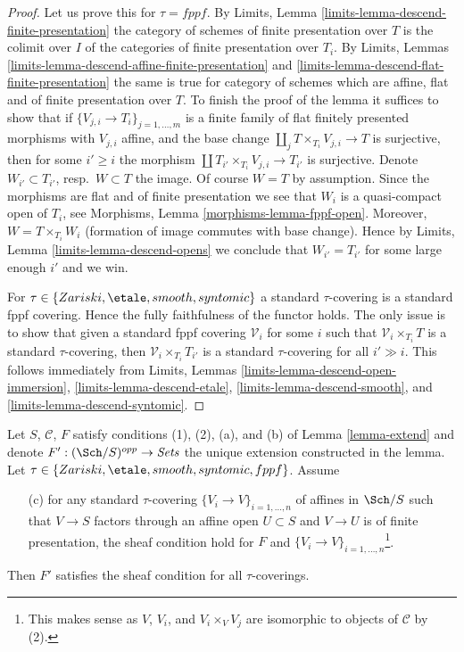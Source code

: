 \begin{proof}
Let us prove this for $\tau = fppf$.
By Limits, Lemma \ref{limits-lemma-descend-finite-presentation}
the category of schemes of finite presentation over $T$ is the
colimit over $I$ of the categories of finite presentation over $T_i$. By
Limits, Lemmas \ref{limits-lemma-descend-affine-finite-presentation}
and \ref{limits-lemma-descend-flat-finite-presentation}
the same is true for category of schemes which are affine, flat and
of finite presentation over $T$.
To finish the proof of the lemma it suffices to show that if
$\{V_{j, i} \to T_i\}_{j = 1, \ldots, m}$ is a finite family of
flat finitely presented morphisms with $V_{j, i}$ affine, and the
base change $\coprod_j T \times_{T_i} V_{j, i} \to T$ is surjective,
then for some $i' \geq i$ the morphism
$\coprod T_{i'} \times_{T_i} V_{j, i} \to T_{i'}$ is surjective.
Denote $W_{i'} \subset T_{i'}$, resp.\ $W \subset T$ the image.
Of course $W = T$ by assumption.
Since the morphisms are flat and of finite presentation we see that
$W_i$ is a quasi-compact open of $T_i$, see
Morphisms, Lemma \ref{morphisms-lemma-fppf-open}.
Moreover, $W = T \times_{T_i} W_i$ (formation of image commutes
with base change). Hence by
Limits, Lemma \ref{limits-lemma-descend-opens}
we conclude that $W_{i'} = T_{i'}$ for some large enough $i'$
and we win.

\medskip\noindent
For $\tau \in \{Zariski, \etale, smooth, syntomic\}$ a standard $\tau$-covering
is a standard fppf covering. Hence the fully faithfulness of the functor
holds. The only issue is to show that given a standard fppf covering
$\mathcal{V}_i$ for some $i$ such that $\mathcal{V}_i \times_{T_i} T$
is a standard $\tau$-covering, then $\mathcal{V}_i \times_{T_i} T_{i'}$
is a standard $\tau$-covering for all $i' \gg i$. This follows immediately
from Limits, Lemmas
\ref{limits-lemma-descend-open-immersion},
\ref{limits-lemma-descend-etale},
\ref{limits-lemma-descend-smooth}, and
\ref{limits-lemma-descend-syntomic}.
\end{proof}

\begin{lemma}
\label{lemma-extend-sheaf-general}
Let $S$, $\mathcal{C}$, $F$ satisfy conditions (1), (2), (a), and (b) of
Lemma \ref{lemma-extend} and denote $F' : (\Sch/S)^{opp} \to \textit{Sets}$
the unique extension constructed in the lemma. Let
$\tau \in \{Zariski, \etale, smooth, syntomic, fppf\}$. Assume
\begin{enumerate}
\item[(c)] for any standard $\tau$-covering $\{V_i \to V\}_{i = 1, \ldots, n}$
of affines in $\Sch/S$ such that $V \to S$ factors through an affine open
$U \subset S$ and $V \to U$ is of finite presentation, the sheaf condition
hold for $F$ and $\{V_i \to V\}_{i = 1, \ldots, n}$\footnote{This makes
sense as $V$, $V_i$, and $V_i \times_V V_j$ are isomorphic to objects
of $\mathcal{C}$ by (2).}.
\end{enumerate}
Then $F'$ satisfies the sheaf condition for all $\tau$-coverings.
\end{lemma}

